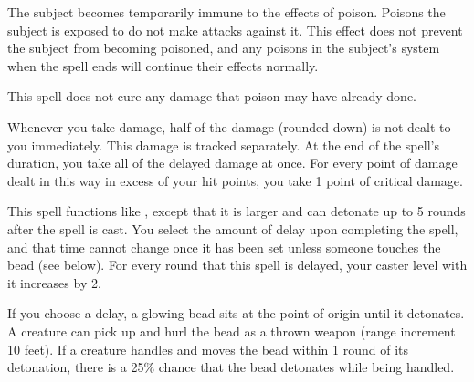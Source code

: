\spellrng{\rngclose}
\spelldur{\durshort}
\begin{spelleffect}
  The subject becomes temporarily immune to the effects of poison. Poisons the subject is exposed to do not make attacks against it. This effect does not prevent the subject from becoming poisoned, and any poisons in the subject's system when the spell ends will continue their effects normally. 
\end{spelleffect}
\begin{spellnotes}
  This spell does not cure any damage that poison may have already done.
\end{spellnotes}

\spelldur{\durmed}
\begin{spelleffect}
    Whenever you take damage, half of the damage (rounded down) is not dealt to you immediately. This damage is tracked separately. At the end of the spell's duration, you take all of the delayed damage at once. For every point of damage dealt in this way in excess of your hit points, you take 1 point of critical damage.
\end{spelleffect}

\begin{spelleffect}
  This spell functions like , except that it is larger and can detonate up to 5 rounds after the spell is cast. You select the amount of delay upon completing the spell, and that time cannot change once it has been set unless someone touches the bead (see below). For every round that this spell is delayed, your caster level with it increases by 2.

  If you choose a delay, a glowing bead sits at the point of origin until it detonates. A creature can pick up and hurl the bead as a thrown weapon (range increment 10 feet). If a creature handles and moves the bead within 1 round of its detonation, there is a 25\% chance that the bead detonates while being handled.
\end{spelleffect}
\begin{spellnotes}
    \destructivespellnotes

    \firespellnotes
\end{spellnotes}

